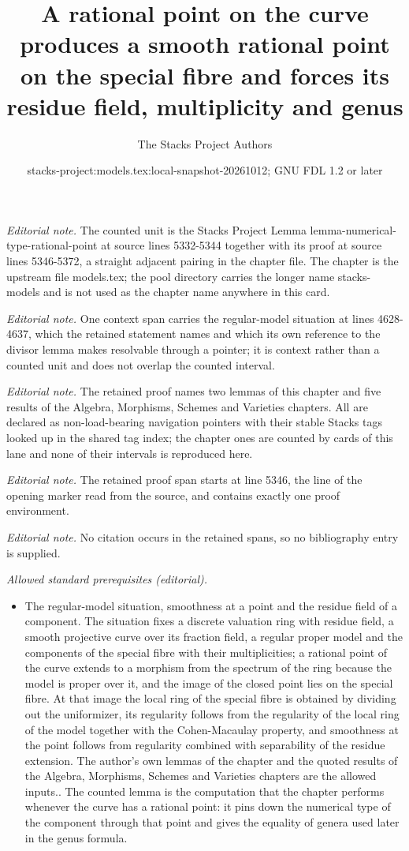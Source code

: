 \documentclass[10pt,a4paper]{amsart}
\title{A rational point on the curve produces a smooth rational point on the special fibre and forces its residue field, multiplicity and genus}
\author{The Stacks Project Authors}
\date{stacks-project:models.tex:local-snapshot-20261012; GNU FDL 1.2 or later}
\theoremstyle{plain}
\theoremstyle{definition}
\theoremstyle{remark}
\numberwithin{equation}{subsection}
\begin{document}
\maketitle
\noindent\textit{Editorial note.} The counted unit is the Stacks Project Lemma lemma-numerical-type-rational-point at source lines 5332-5344 together with its proof at source lines 5346-5372, a straight adjacent pairing in the chapter file. The chapter is the upstream file models.tex; the pool directory carries the longer name stacks-models and is not used as the chapter name anywhere in this card.\par\medskip
\noindent\textit{Editorial note.} One context span carries the regular-model situation at lines 4628-4637, which the retained statement names and which its own reference to the divisor lemma makes resolvable through a pointer; it is context rather than a counted unit and does not overlap the counted interval.\par\medskip
\noindent\textit{Editorial note.} The retained proof names two lemmas of this chapter and five results of the Algebra, Morphisms, Schemes and Varieties chapters. All are declared as non-load-bearing navigation pointers with their stable Stacks tags looked up in the shared tag index; the chapter ones are counted by cards of this lane and none of their intervals is reproduced here.\par\medskip
\noindent\textit{Editorial note.} The retained proof span starts at line 5346, the line of the opening marker read from the source, and contains exactly one proof environment.\par\medskip
\noindent\textit{Editorial note.} No citation occurs in the retained spans, so no bibliography entry is supplied.\par\medskip
\noindent\textit{Allowed standard prerequisites (editorial).}\begin{itemize}
\item The regular-model situation, smoothness at a point and the residue field of a component. The situation fixes a discrete valuation ring with residue field, a smooth projective curve over its fraction field, a regular proper model and the components of the special fibre with their multiplicities; a rational point of the curve extends to a morphism from the spectrum of the ring because the model is proper over it, and the image of the closed point lies on the special fibre. At that image the local ring of the special fibre is obtained by dividing out the uniformizer, its regularity follows from the regularity of the local ring of the model together with the Cohen-Macaulay property, and smoothness at the point follows from regularity combined with separability of the residue extension. The author's own lemmas of the chapter and the quoted results of the Algebra, Morphisms, Schemes and Varieties chapters are the allowed inputs.. The counted lemma is the computation that the chapter performs whenever the curve has a rational point: it pins down the numerical type of the component through that point and gives the equality of genera used later in the genus formula.
\end{itemize}\medskip
\end{document}
